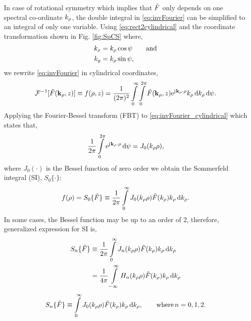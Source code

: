 \documentclass[12pt]{article}
\begin{document}
In case of rotational symmetry which implies that $\tilde{F}$ only depends on one spectral co-ordinate $k_{\rho}$, the double integral in \eqref{eq:invFourier} can be simplified to an integral of only one variable. Using  \eqref{eq:rect2cylindrical} and the coordinate transformation shown in Fig. \ref{fig:SpCS} where,
%
\begin{subequations}
  \begin{align}
    k_x ={}& k_{\rho} \cos \psi \qquad \text{and}
    \label{eq:kx2kp}\\
    k_y ={}& k_{\rho} \sin \psi,
    \label{eq:ky2kp}
  \end{align}
  \label{eq:cylindricaltransformation}%
\end{subequations}
we rewrite \eqref{eq:invFourier} in cylindrical coordinates,
%
\begin{equation}
  \mathcal{F}^{-1} [\tilde{F}(\mathbf{k}_{\rho},z)] \equiv f(\mathbf{\rho},z) = \frac{1}{(2\pi)^2} \int\limits_0^{\infty} \int\limits_0^{2\pi}
  \tilde{F}(\mathbf{k}_{\rho},z) \mathrm{e}^{\mathrm{j}\mkern1mu \mathbf{k}_{\rho} \cdot \mathbf{\rho}} k_{\rho} \mathop{}\!\mathrm{d}{k_{\rho}} \mathop{}\!\mathrm{d}{\psi}.
  \label{eq:invFourier_cylindrical}
\end{equation}
%
Applying the Fourier-Bessel transform (FBT) to \eqref{eq:invFourier_cylindrical} which states that,
\begin{equation}
  \frac{1}{2\pi}\int\limits_0^{2\pi}
  \mathrm{e}^{\mathrm{j}\mkern1mu \mathbf{k}_{\rho} \cdot \mathbf{\rho}} \mathop{}\!\mathrm{d}{\psi} = J_0(k_{\rho}\rho),
  \label{eq:hankel_transofrm}
\end{equation}
%
where $J_0(\cdot)$ is the Bessel function of zero order
we obtain the Sommerfeld integral (SI), $S_0\{\cdot\}$:
%
\begin{equation}
  f(\rho) = S_0\{\tilde{F}\} \equiv \frac{1}{2\pi}\int\limits_0^{\infty} J_0(k_{\rho}\rho)  \tilde{F}(k_{\rho}) k_{\rho} \mathop{}\!\mathrm{d}{k_{\rho}}.
  \label{eq:sommerfeld_integral}
\end{equation}
%
In some cases, the Bessel function may be up to an order of 2, therefore, generalized expression for SI is,
%
\begin{equation}
  \begin{split}
    S_n\{\ti{F}\} \equiv{}& \frac{1}{2\pi}\int\limits_0^{\inf} J_n(k_{\p}\p)  \ti{F}(k_{\p}) k_{\p} \diff{k_{\p}}\\
    ={}& \frac{1}{4\pi}\int\limits_{-\inf}^{\inf} H_n(k_{\p}\p)  \ti{F}(k_{\p}) k_{\p} \diff{k_{\p}}
  \end{split}
  \label{eq:dFT_ET}%
\end{equation}
%
\begin{equation}
  S_n\{\tilde{F}\} \equiv \int\limits_0^{\infty} J_0(k_{\rho}\rho)  \tilde{F}(k_{\rho}) k_{\rho} \mathop{}\!\mathrm{d}{k_{\rho}}, \qquad \text{where} \, n = 0,1,2.
  \label{eq:generalized_SI}
\end{equation}
\end{document}

